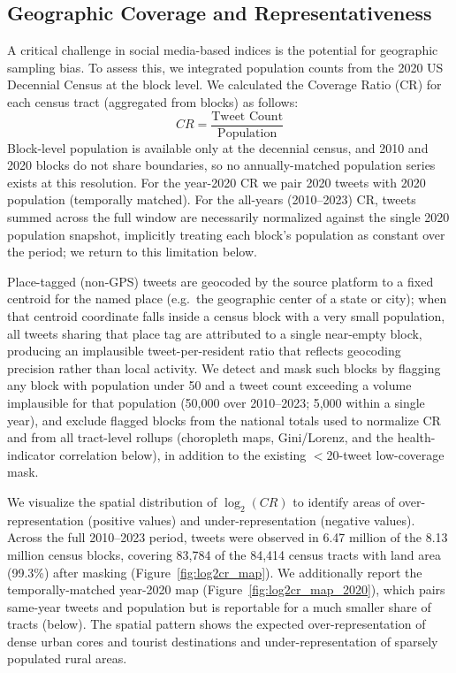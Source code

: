 \documentclass[fleqn,10pt]{wlscirep}
\begin{document}
\subsection*{Geographic Coverage and Representativeness}

A critical challenge in social media-based indices is the potential for geographic sampling bias. To assess this, we integrated population counts from the 2020 US Decennial Census at the block level. We calculated the Coverage Ratio (CR) for each census tract (aggregated from blocks) as follows:
\[
CR = \frac{\text{Tweet Count}}{\text{Population}}
\]
Block-level population is available only at the decennial census, and 2010 and 2020 blocks do not share boundaries, so no annually-matched population series exists at this resolution. For the year-2020 CR we pair 2020 tweets with 2020 population (temporally matched). For the all-years (2010--2023) CR, tweets summed across the full window are necessarily normalized against the single 2020 population snapshot, implicitly treating each block's population as constant over the period; we return to this limitation below.

Place-tagged (non-GPS) tweets are geocoded by the source platform to a fixed centroid for the named place (e.g.\ the geographic center of a state or city); when that centroid coordinate falls inside a census block with a very small population, all tweets sharing that place tag are attributed to a single near-empty block, producing an implausible tweet-per-resident ratio that reflects geocoding precision rather than local activity. We detect and mask such blocks by flagging any block with population under 50 and a tweet count exceeding a volume implausible for that population (50,000 over 2010--2023; 5,000 within a single year), and exclude flagged blocks from the national totals used to normalize CR and from all tract-level rollups (choropleth maps, Gini/Lorenz, and the health-indicator correlation below), in addition to the existing $<$20-tweet low-coverage mask.

We visualize the spatial distribution of $\log_2(CR)$ to identify areas of over-representation (positive values) and under-representation (negative values). Across the full 2010--2023 period, tweets were observed in 6.47 million of the 8.13 million census blocks, covering 83,784 of the 84,414 census tracts with land area (99.3\%) after masking (Figure~\ref{fig:log2cr_map}). We additionally report the temporally-matched year-2020 map (Figure~\ref{fig:log2cr_map_2020}), which pairs same-year tweets and population but is reportable for a much smaller share of tracts (below). The spatial pattern shows the expected over-representation of dense urban cores and tourist destinations and under-representation of sparsely populated rural areas.
\end{document}
